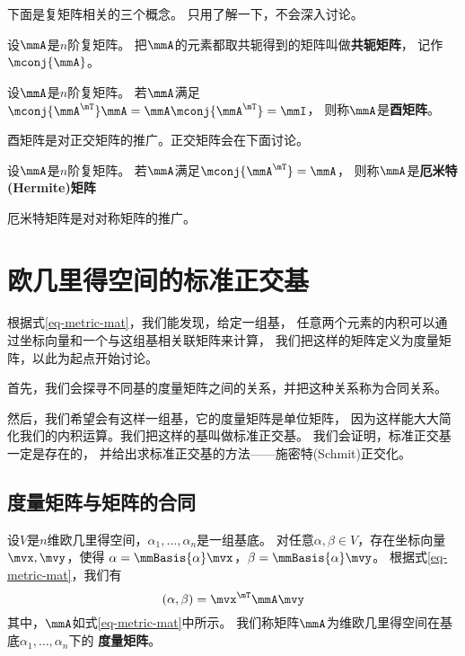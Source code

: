 下面是复矩阵相关的三个概念。
只用了解一下，不会深入讨论。

\begin{definition}[共轭矩阵]
  设$\mmA$是$n$阶复矩阵。
  把$\mmA$的元素都取共轭得到的矩阵叫做\textbf{共轭矩阵}，
  记作$\mconj{\mmA}$。
\end{definition}

\begin{definition}[酉矩阵]
  设$\mmA$是$n$阶复矩阵。
  若$\mmA$满足$\mconj{\mmA^\mT}\mmA=\mmA\mconj{\mmA^\mT}=\mmI$，
  则称$\mmA$是\textbf{酉矩阵}。
\end{definition}

\begin{remark}
  酉矩阵是对正交矩阵的推广。正交矩阵会在下面讨论。
\end{remark}

\begin{definition}
  设$\mmA$是$n$阶复矩阵。
  若$\mmA$满足$\mconj{\mmA^\mT}=\mmA$，
  则称$\mmA$是\textbf{厄米特(Hermite)矩阵}
\end{definition}

\begin{remark}
  厄米特矩阵是对对称矩阵的推广。
\end{remark}

\section{欧几里得空间的标准正交基}
根据式\ref{eq-metric-mat}，我们能发现，给定一组基，
任意两个元素的内积可以通过坐标向量和一个与这组基相关联矩阵来计算，
我们把这样的矩阵定义为度量矩阵，以此为起点开始讨论。

首先，我们会探寻不同基的度量矩阵之间的关系，并把这种关系称为合同关系。

然后，我们希望会有这样一组基，它的度量矩阵是单位矩阵，
因为这样能大大简化我们的内积运算。我们把这样的基叫做标准正交基。
我们会证明，标准正交基一定是存在的，
并给出求标准正交基的方法——施密特(Schmit)正交化。


\subsection{度量矩阵与矩阵的合同}
\begin{definition}[度量矩阵]
  设$V$是$n$维欧几里得空间，$\alpha_1,\dots,\alpha_n$是一组基底。
  对任意$\alpha,\beta\in V$，存在坐标向量$\mvx,\mvy$，使得
  $\alpha=\mmBasis{\alpha}\mvx$，$\beta=\mmBasis{\alpha}\mvy$。
  根据式\ref{eq-metric-mat}，我们有
  \begin{displaymath}
    (\alpha,\beta) = \mvx^\mT\mmA\mvy
  \end{displaymath}
  其中，$\mmA$如式\ref{eq-metric-mat}中所示。
  我们称矩阵$\mmA$为维欧几里得空间在基底$\alpha_1,\dots,\alpha_n$下的
  \textbf{度量矩阵}。
\end{definition}

